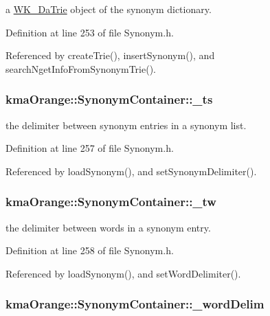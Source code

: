 a \hyperlink{classkmaOrange_1_1WK__DaTrie}{WK\_\-DaTrie} object of the synonym dictionary. 



Definition at line 253 of file Synonym.h.

Referenced by createTrie(), insertSynonym(), and searchNgetInfoFromSynonymTrie().\hypertarget{classkmaOrange_1_1SynonymContainer_82b68d5f1bb2d6ee90c2823cc4e780a7}{
\subsubsection[{\_\-ts}]{ {\bf kmaOrange::SynonymContainer::\_\-ts}}}
\label{classkmaOrange_1_1SynonymContainer_82b68d5f1bb2d6ee90c2823cc4e780a7}


the delimiter between synonym entries in a synonym list. 



Definition at line 257 of file Synonym.h.

Referenced by loadSynonym(), and setSynonymDelimiter().\hypertarget{classkmaOrange_1_1SynonymContainer_88b0c5b78080af8bdfe304a60486515a}{
\subsubsection[{\_\-tw}]{ {\bf kmaOrange::SynonymContainer::\_\-tw}}}
\label{classkmaOrange_1_1SynonymContainer_88b0c5b78080af8bdfe304a60486515a}


the delimiter between words in a synonym entry. 



Definition at line 258 of file Synonym.h.

Referenced by loadSynonym(), and setWordDelimiter().\hypertarget{classkmaOrange_1_1SynonymContainer_1d7f4e1537f92654087c85968f1f11ca}{
\subsubsection[{\_\-wordDelim}]{ {\bf kmaOrange::SynonymContainer::\_\-wordDelim}}}
\label{classkmaOrange_1_1SynonymContainer_1d7f4e1537f92654087c85968f1f11ca}


